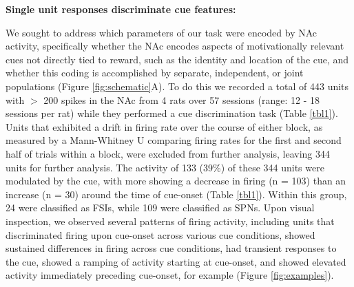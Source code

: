 \documentclass[11pt]{article}
\begin{document}
{\bf Single unit responses discriminate cue features:}

We sought to address which parameters of our task were encoded by NAc activity, specifically whether the NAc encodes aspects of motivationally relevant cues not directly tied to reward, such as the identity and location of the cue, and whether this coding is accomplished by separate, independent, or joint populations (Figure \ref{fig:schematic}A). To do this we recorded a total of 443 units with $>$ 200 spikes in the NAc from 4 rats over 57 sessions (range: 12 - 18 sessions per rat) while they performed a cue discrimination task (Table \ref{tbl1}). Units that exhibited a drift in firing rate over the course of either block, as measured by a Mann-Whitney U comparing firing rates for the first and second half of trials within a block, were excluded from further analysis, leaving 344 units for further analysis. The activity of 133 (39\%) of these 344 units were modulated by the cue, with more showing a decrease in firing (n = 103) than an increase (n = 30) around the time of cue-onset (Table \ref{tbl1}). Within this group, 24 were classified as FSIs, while 109 were classified as SPNs. Upon visual inspection, we observed several patterns of firing activity, including units that discriminated firing upon cue-onset across various cue conditions, showed sustained differences in firing across cue conditions, had transient responses to the cue, showed a ramping of activity starting at cue-onset, and showed elevated activity immediately preceding cue-onset, for example (Figure \ref{fig:examples}). 
\end{document}
